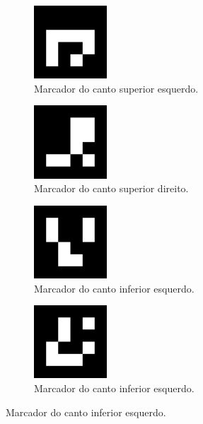 \documentclass[12pt]{report}
\begin{document}
\begin{figure}[H]
  \centering
  \begin{subfigure}{0.4\textwidth}
    \centering
    \includegraphics[width=0.3\textwidth]{imagens/4x4_1000-1.png}
    \caption{Marcador do canto superior esquerdo.}
    \label{fig:TOPLEFT}
  \end{subfigure}
  \begin{subfigure}{0.4\textwidth}
    \centering
    \includegraphics[width=0.3\textwidth]{imagens/4x4_1000-2.png}
    \caption{Marcador do canto superior direito.}
    \label{fig:TOPRIGHT}
  \end{subfigure}
  \begin{subfigure}{0.4\textwidth}
    \centering
    \includegraphics[width=0.3\textwidth]{imagens/4x4_1000-3.png}
    \caption{Marcador do canto inferior esquerdo.}
    \label{fig:BOTTOMLEFT}
  \end{subfigure}
  \begin{subfigure}{0.4\textwidth}
    \centering
    \includegraphics[width=0.3\textwidth]{imagens/4x4_1000-4.png}
    \caption{Marcador do canto inferior esquerdo.}
    \label{fig:BOTTOMRIGHT}
  \end{subfigure}
\end{figure}
\end{document}

